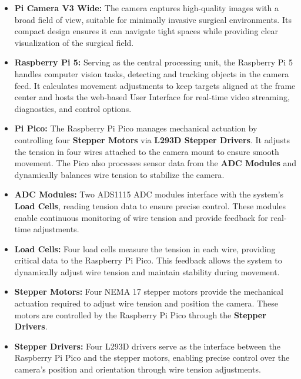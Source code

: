 \begin{itemize}
    \item \textbf{Pi Camera V3 Wide:} The camera captures high-quality images with a broad field of view, suitable for minimally invasive surgical environments. Its compact design ensures it can navigate tight spaces while providing clear visualization of the surgical field.

    \item \textbf{Raspberry Pi 5:} Serving as the central processing unit, the Raspberry Pi 5 handles computer vision tasks, detecting and tracking objects in the camera feed. It calculates movement adjustments to keep targets aligned at the frame center and hosts the web-based User Interface for real-time video streaming, diagnostics, and control options.

    \item \textbf{Pi Pico:} The Raspberry Pi Pico manages mechanical actuation by controlling four \textbf{Stepper Motors} via \textbf{L293D Stepper Drivers}. It adjusts the tension in four wires attached to the camera mount to ensure smooth movement. The Pico also processes sensor data from the \textbf{ADC Modules} and dynamically balances wire tension to stabilize the camera.

    \item \textbf{ADC Modules:} Two ADS1115 ADC modules interface with the system's \textbf{Load Cells}, reading tension data to ensure precise control. These modules enable continuous monitoring of wire tension and provide feedback for real-time adjustments.

    \item \textbf{Load Cells:} Four load cells measure the tension in each wire, providing critical data to the Raspberry Pi Pico. This feedback allows the system to dynamically adjust wire tension and maintain stability during movement.

    \item \textbf{Stepper Motors:} Four NEMA 17 stepper motors provide the mechanical actuation required to adjust wire tension and position the camera. These motors are controlled by the Raspberry Pi Pico through the \textbf{Stepper Drivers}.

    \item \textbf{Stepper Drivers:} Four L293D drivers serve as the interface between the Raspberry Pi Pico and the stepper motors, enabling precise control over the camera's position and orientation through wire tension adjustments.
\end{itemize}

